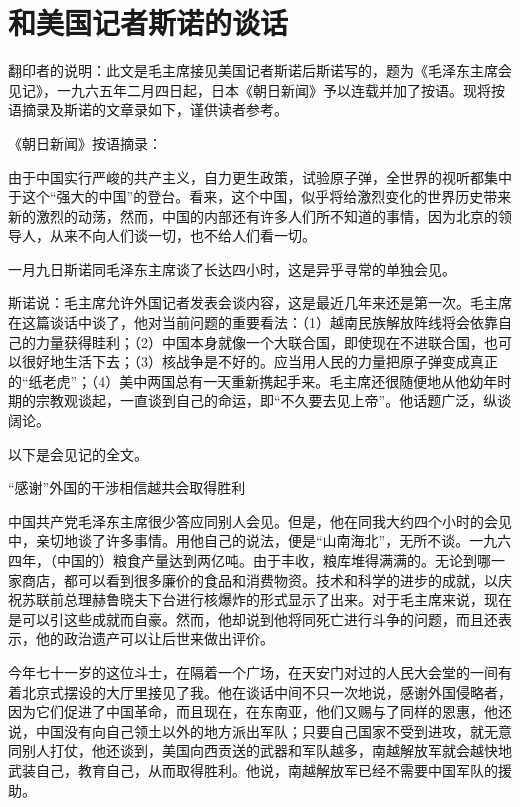 \section[和美国记者斯诺的谈话（一九六五年一月九日）]{和美国记者斯诺的谈话}


翻印者的说明：此文是毛主席接见美国记者斯诺后斯诺写的，题为《毛泽东主席会见记》，一九六五年二月四日起，日本《朝日新闻》予以连载并加了按语。现将按语摘录及斯诺的文章录如下，谨供读者参考。

《朝日新闻》按语摘录：

由于中国实行严峻的共产主义，自力更生政策，试验原子弹，全世界的视听都集中于这个“强大的中国”的登台。看来，这个中国，似乎将给激烈变化的世界历史带来新的激烈的动荡，然而，中国的内部还有许多人们所不知道的事情，因为北京的领导人，从来不向人们谈一切，也不给人们看一切。

一月九日斯诺同毛泽东主席谈了长达四小时，这是异乎寻常的单独会见。

斯诺说：毛主席允许外国记者发表会谈内容，这是最近几年来还是第一次。毛主席在这篇谈话中谈了，他对当前问题的重要看法：（1）越南民族解放阵线将会依靠自己的力量获得眭利；（2）中国本身就像一个大联合国，即使现在不进联合国，也可以很好地生活下去；（3）核战争是不好的。应当用人民的力量把原子弹变成真正的“纸老虎”；（4）美中两国总有一天重新携起手来。毛主席还很随便地从他幼年时期的宗教观谈起，一直谈到自己的命运，即“不久要去见上帝”。他话题广泛，纵谈阔论。

以下是会见记的全文。

“感谢”外国的干涉相信越共会取得胜利

中国共产党毛泽东主席很少答应同别人会见。但是，他在同我大约四个小时的会见中，亲切地谈了许多事情。用他自己的说法，便是“山南海北”，无所不谈。一九六四年，（中国的）粮食产量达到两亿吨。由于丰收，粮库堆得满满的。无论到哪一家商店，都可以看到很多廉价的食品和消费物资。技术和科学的进步的成就，以庆祝苏联前总理赫鲁晓夫下台进行核爆炸的形式显示了出来。对于毛主席来说，现在是可以引这些成就而自豪。然而，他却说到他将同死亡进行斗争的问题，而且还表示，他的政治遗产可以让后世来做出评价。

今年七十一岁的这位斗士，在隔着一个广场，在天安门对过的人民大会堂的一间有着北京式摆设的大厅里接见了我。他在谈话中间不只一次地说，感谢外国侵略者，因为它们促进了中国革命，而且现在，在东南亚，他们又赐与了同样的恩惠，他还说，中国没有向自己领土以外的地方派出军队；只要自己国家不受到进攻，就无意同别人打仗，他还谈到，美国向西贡送的武器和军队越多，南越解放军就会越快地武装自己，教育自己，从而取得胜利。他说，南越解放军已经不需要中国军队的援助。

